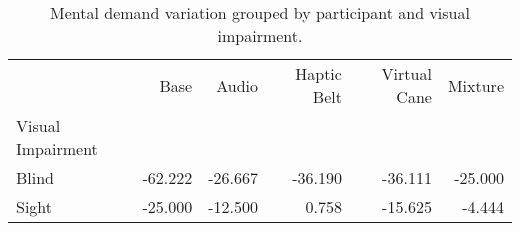 
\begin{table}[!htb]
\centering
\caption{Mental demand variation grouped by participant and visual impairment.}
\label{tab:md_var_average_group}
\begin{tabular}{lrrrrr}
\toprule
{} &    Base &   Audio &  Haptic Belt &  Virtual Cane &  Mixture \\
Visual Impairment &         &         &              &               &          \\
\midrule
Blind             & -62.222 & -26.667 &      -36.190 &       -36.111 &  -25.000 \\
Sight             & -25.000 & -12.500 &        0.758 &       -15.625 &   -4.444 \\
\bottomrule
\end{tabular}
\end{table}

